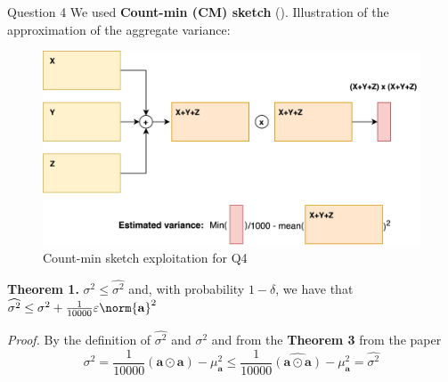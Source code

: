  \begin{block}{Question 4}
We used \textbf{Count-min (CM) sketch} (\cite{cm-sketch}). Illustration of the approximation of the aggregate variance:

\begin{figure}
    \centering
    \includegraphics[width=.8\linewidth]{../assets/images/q4_sketch_usage.png}
    \caption{Count-min sketch exploitation for Q4}
    \label{fig:q4_sketch}
\end{figure}


%        
%        

\textbf{Theorem 1.} $\sigma^2\leq\widehat{\sigma^2}$ and, with probability $1-\delta$, we have that $\widehat{\sigma^2}\leq\sigma^2 + \frac{1}{10000}\varepsilon\norm{\mathbf{a}}^2$

\emph{Proof.} By the definition of $\widehat{\sigma^2}$ and $\sigma^2$ and from the \textbf{Theorem 3} from the \cite{cm-sketch} paper
\begin{equation}
    \sigma^2=\frac{1}{10000}(\mathbf{a}\odot\mathbf{a})-\mu_{\mathbf{a}}^2\leq\frac{1}{10000}\widehat{(\mathbf{a}\odot\mathbf{a})}-\mu_{\mathbf{a}}^2=\widehat{\sigma^2}    
\end{equation}


\end{block}
